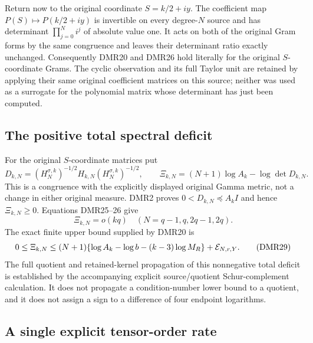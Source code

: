 Return now to the original coordinate $S=k/2+iy$.
The coefficient map $P(S)\mapsto P(k/2+iy)$ is invertible
on every degree-$N$ source and has determinant
$\prod_{j=0}^Ni^j$ of absolute value one. It acts on both
of the original Gram forms by the same congruence and
leaves their determinant ratio exactly unchanged.
Consequently DMR20 and DMR26 hold literally for the
original $S$-coordinate Grams. The cyclic observation
and its full Taylor unit are retained by applying their
same original coefficient matrices on this source;
neither was used as a surrogate for the polynomial
matrix whose determinant has just been computed.

\subsection{The positive total spectral deficit}

For the original $S$-coordinate matrices put
\[
 D_{k,N}=(H_N^{\sigma,k})^{-1/2}H_{k,N}
                              (H_N^{\sigma,k})^{-1/2},\qquad
 \Xi_{k,N}=(N+1)\log A_k-\log\det D_{k,N}.
 \tag{DMR27}
\]
This is a congruence with the explicitly displayed original
Gamma metric, not a change in either original measure.
DMR2 proves $0<D_{k,N}\preceq A_k I$ and hence
$\Xi_{k,N}\geq0$. Equations DMR25--26 give
\[
 \boxed{\quad \Xi_{k,N}=o(kq)\quad
       (N=q-1,q,2q-1,2q).\quad}
 \tag{DMR28}
\]
The exact finite upper bound supplied by DMR20 is
\[
 0\leq\Xi_{k,N}
  \leq(N+1)\{\log A_k-\log b-(k-3)\log M_R\}
                          +{\cal E}_{N,r,Y}.
 \tag{DMR29}
\]
The full quotient and retained-kernel propagation of this
nonnegative total deficit is established by the accompanying
explicit source/quotient Schur-complement calculation.
It does not propagate a condition-number lower bound to
a quotient, and it does not assign a sign to a difference
of four endpoint logarithms.

\subsection{A single explicit tensor-order rate}


